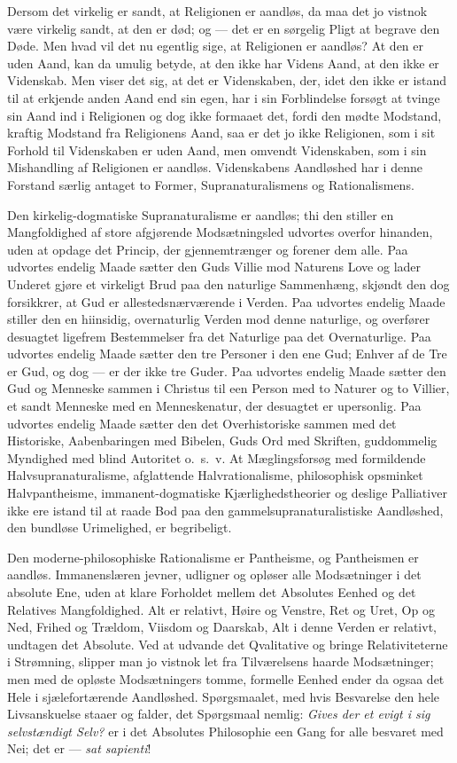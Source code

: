 \documentclass[12pt]{book}
\begin{document}
Dersom det virkelig er sandt, at Religionen er aandløs, da maa det
jo vistnok være virkelig sandt, at den er død; og --- det er en
sørgelig Pligt at begrave den Døde. Men hvad vil det nu egentlig
sige, at Religionen er aandløs? At den er uden Aand, kan da umulig
betyde, at den
ikke har Videns Aand, at den ikke er Videnskab. Men viser det sig,
at det er Videnskaben, der, idet den ikke er istand til at erkjende
anden Aand end sin egen, har i sin Forblindelse forsøgt at tvinge
sin Aand ind i Religionen og dog ikke formaaet det, fordi den mødte
Modstand, kraftig Modstand fra Religionens Aand, saa er det jo ikke
Religionen, som i sit Forhold til Videnskaben er uden Aand, men
omvendt Videnskaben, som i sin Mishandling af Religionen er aandløs.
Videnskabens Aandløshed har i denne Forstand særlig antaget to
Former, Supranaturalismens og Rationalismens.

Den kirkelig-dogmatiske Supranaturalisme er aandløs; thi den stiller
en Mangfoldighed af store afgjørende Modsætningsled udvortes overfor
hinanden, uden at opdage det Princip, der gjennemtrænger og forener
dem alle. Paa udvortes endelig Maade sætter den Guds Villie mod
Naturens Love og lader Underet gjøre et virkeligt Brud paa den
naturlige Sammenhæng, skjøndt den dog forsikkrer, at Gud er
allestedsnærværende i Verden. Paa udvortes endelig Maade stiller den
en hiinsidig, overnaturlig Verden mod denne naturlige, og overfører
desuagtet ligefrem Bestemmelser fra det Naturlige paa det
Overnaturlige. Paa udvortes endelig Maade sætter den tre Personer i
den ene Gud; Enhver af de Tre er Gud, og dog --- er der ikke tre
Guder. Paa udvortes endelig Maade sætter den Gud og Menneske sammen
i Christus til een Person med to Naturer og to Villier, et sandt
Menneske med en Menneskenatur, der desuagtet er upersonlig. Paa
udvortes endelig Maade sætter den det Overhistoriske sammen med det
Historiske, Aabenbaringen med Bibelen, Guds Ord med Skriften,
guddommelig Myndighed med blind Autoritet o.\ s.\ v. At
Mæglingsforsøg med formildende Halvsupranaturalisme, afglattende
Halvrationalisme, philosophisk opsminket Halvpantheisme,
immanent-dogmatiske Kjærlighedstheorier og deslige Palliativer ikke
ere istand til at raade Bod paa den gammelsupranaturalistiske
Aandløshed, den bundløse Urimelighed, er begribeligt.

Den moderne-philosophiske Rationalisme er Pantheisme, og
Pantheismen er aandløs. Immanenslæren jevner, udligner og opløser
alle Modsætninger i det absolute Ene, uden at klare Forholdet mellem
det Absolutes Eenhed og det Relatives Mangfoldighed. Alt er
relativt, Høire og Venstre, Ret og Uret, Op og Ned, Frihed og
Trældom, Viisdom og Daarskab, Alt i denne Verden er relativt,
undtagen det Absolute. Ved at udvande det Qvalitative og bringe
Relativiteterne i Strømning, slipper man jo vistnok let fra
Tilværelsens haarde Modsætninger; men med de opløste Modsætningers
tomme, formelle Eenhed ender da ogsaa det Hele i sjælefortærende
Aandløshed. Spørgsmaalet, med hvis Besvarelse den hele Livsanskuelse
staaer og falder, det Spørgsmaal nemlig: \emph{Gives der et evigt i
sig selvstændigt Selv?} er i det Absolutes Philosophie een Gang for
alle besvaret med Nei; det er --- \textit{sat sapienti}!
\end{document}
